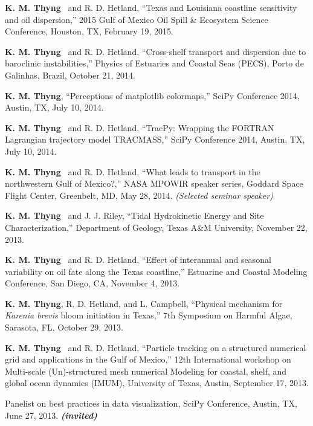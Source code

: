 \documentclass[10pt,letterpaper]{article}
\newcommand{\kmt}{\textbf{K. M. Thyng}}
\newcommand{\inv}{\textbf{\textit{(invited)}}}
\renewenvironment{itemize}{
  \begin{list}{}{
    \setlength{\leftmargin}{1.5em}
    \setlength{\itemsep}{0.25em}
    \setlength{\parskip}{0pt}
    \setlength{\parsep}{0.25em}
  }
}{
  \end{list}
}
\begin{document}
\begin{itemize}
\item \kmt~ and R. D. Hetland, ``Texas and Louisiana coastline sensitivity and oil dispersion,'' 2015 Gulf of Mexico Oil Spill \& Ecosystem Science Conference, Houston, TX, February 19, 2015.

\item \kmt~ and R. D. Hetland, ``Cross-shelf transport and dispersion due to baroclinic instabilities,'' Physics of Estuaries and Coastal Seas (PECS), Porto de Galinhas, Brazil, October 21, 2014.

\item \kmt, ``Perceptions of matplotlib colormaps,'' SciPy Conference 2014, Austin, TX, July 10, 2014.

\item \kmt~ and R. D. Hetland, ``TracPy: Wrapping the FORTRAN Lagrangian trajectory model TRACMASS,'' SciPy Conference 2014, Austin, TX, July 10, 2014.

\item \kmt~ and R. D. Hetland, ``What leads to transport in the northwestern Gulf of Mexico?,'' NASA MPOWIR speaker series, Goddard Space Flight Center, Greenbelt, MD, May 28, 2014. \textit{(Selected seminar speaker)}

\item \kmt~ and J. J. Riley, ``Tidal Hydrokinetic Energy and Site Characterization,'' Department of Geology, Texas A\&M University, November 22, 2013.

\item \kmt~ and R. D. Hetland, ``Effect of interannual and seasonal variability on oil fate along the Texas coastline,'' Estuarine and Coastal Modeling Conference, San Diego, CA, November 4, 2013.

\item \kmt, R. D. Hetland, and L. Campbell, ``Physical mechanism for \textit{Karenia brevis} bloom initiation in Texas,'' 7th Symposium on Harmful Algae, Sarasota, FL, October 29, 2013.

\item \kmt~ and R. D. Hetland, ``Particle tracking on a structured numerical grid and applications in the Gulf of Mexico,'' 12th International workshop on Multi-scale (Un)-structured mesh numerical Modeling for coastal, shelf, and global ocean dynamics (IMUM), University of Texas, Austin, September 17, 2013.

\item Panelist on best practices in data visualization, SciPy Conference, Austin, TX, June 27, 2013. \inv


\end{itemize}
\end{document}
